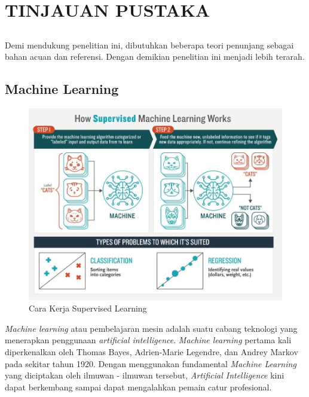 \chapter{TINJAUAN PUSTAKA}
\vspace{1ex}

\section*{}
Demi mendukung penelitian ini, dibutuhkan beberapa teori penunjang sebagai bahan acuan dan referensi. Dengan demikian penelitian ini menjadi lebih terarah. 
\vspace{1ex}

\section{Machine Learning}
\vspace{1ex}

\begin{figure} [!htb]
	\captionsetup{justification=centering}
	\includegraphics[scale=0.2]{img/supervised.jpeg}
	\caption{Cara Kerja Supervised Learning\cite{cit:8}}
	\label{fig:2.1}
\end{figure}

\textit{Machine learning} atau pembelajaran mesin adalah suatu cabang teknologi yang menerapkan penggunaan \textit{artificial intelligence}. \textit{Machine learning} pertama kali diperkenalkan oleh Thomas Bayes, Adrien-Marie Legendre, dan Andrey Markov pada sekitar tahun 1920\cite{cit:7}. Dengan menggunakan fundamental \textit{Machine Learning} yang diciptakan oleh ilmuwan - ilmuwan tersebut, \textit{Artificial Intelligence} kini dapat berkembang sampai dapat mengalahkan pemain catur profesional.
\vspace{1ex}


